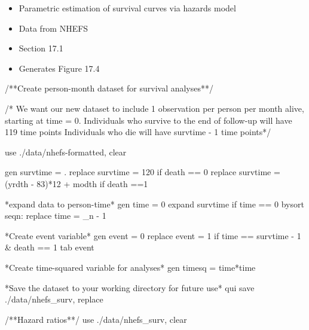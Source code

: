 \documentclass[
  10pt,
  a4paper,
]{book}
\newenvironment{Shaded}{\begin{snugshade}}{\end{snugshade}}
\newcommand{\CommentTok}[1]{\textcolor[rgb]{0.37,0.37,0.37}{#1}}
\newcommand{\DataTypeTok}[1]{\textcolor[rgb]{0.68,0.00,0.00}{#1}}
\newcommand{\KeywordTok}[1]{\textcolor[rgb]{0.00,0.46,0.62}{#1}}
\newcommand{\NormalTok}[1]{\textcolor[rgb]{0.00,0.46,0.62}{#1}}
\providecommand{\tightlist}{%
  \setlength{\itemsep}{0pt}\setlength{\parskip}{0pt}}
\begin{document}
\begin{itemize}
\tightlist
\item
  Parametric estimation of survival curves via hazards model
\item
  Data from NHEFS
\item
  Section 17.1
\item
  Generates Figure 17.4
\end{itemize}

\begin{Shaded}
\begin{Highlighting}[]
\CommentTok{/**Create person{-}month dataset for survival analyses**/}

\CommentTok{/* We want our new dataset to include 1 observation per person }
\CommentTok{per month alive, starting at time = 0.}
\CommentTok{Individuals who survive to the end of follow{-}up will have }
\CommentTok{119 time points}
\CommentTok{Individuals who die will have survtime {-} 1 time points*/}

\KeywordTok{use}\NormalTok{ ./}\KeywordTok{data}\NormalTok{/nhefs{-}formatted, }\KeywordTok{clear}

\KeywordTok{gen}\NormalTok{ survtime = .}
\KeywordTok{replace}\NormalTok{ survtime = 120 }\KeywordTok{if}\NormalTok{ death == 0}
\KeywordTok{replace}\NormalTok{ survtime = (yrdth {-} 83)*12 + modth }\KeywordTok{if}\NormalTok{ death ==1}

\NormalTok{*expand }\KeywordTok{data}\NormalTok{ to person{-}time*}
\KeywordTok{gen}\NormalTok{ time = 0}
\NormalTok{expand survtime }\KeywordTok{if}\NormalTok{ time == 0}
\KeywordTok{bysort}\NormalTok{ seqn: }\KeywordTok{replace}\NormalTok{ time = }\DataTypeTok{\_n}\NormalTok{ {-} 1}

\NormalTok{*Create event }\KeywordTok{variable}\NormalTok{*}
\KeywordTok{gen}\NormalTok{ event = 0}
\KeywordTok{replace}\NormalTok{ event = 1 }\KeywordTok{if}\NormalTok{ time == survtime {-} 1 \& death == 1}
\KeywordTok{tab}\NormalTok{ event}

\NormalTok{*Create time{-}squared }\KeywordTok{variable} \KeywordTok{for}\NormalTok{ analyses*}
\KeywordTok{gen}\NormalTok{ timesq = time*time}

\NormalTok{*Save the dataset to your working directory }\KeywordTok{for}\NormalTok{ future }\KeywordTok{use}\NormalTok{*}
\KeywordTok{qui} \KeywordTok{save}\NormalTok{ ./}\KeywordTok{data}\NormalTok{/nhefs\_surv, }\KeywordTok{replace}

\CommentTok{/**Hazard ratios**/}
\KeywordTok{use}\NormalTok{ ./}\KeywordTok{data}\NormalTok{/nhefs\_surv, }\KeywordTok{clear}


\end{Highlighting}
\end{Shaded}
\end{document}
